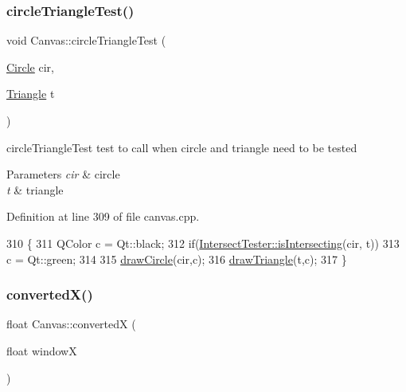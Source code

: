 \mbox{\label{class_canvas_a528559214b858f9f9cd0a57ca95fb630}} 
\subsubsection{\texorpdfstring{circle\+Triangle\+Test()}{circleTriangleTest()}}
{\footnotesize\ttfamily void Canvas\+::circle\+Triangle\+Test (\begin{DoxyParamCaption}\item[{\hyperlink{class_circle}{Circle}}]{cir,  }\item[{\hyperlink{class_triangle}{Triangle}}]{t }\end{DoxyParamCaption})\hspace{0.3cm}{\ttfamily [private]}}



circle\+Triangle\+Test test to call when circle and triangle need to be tested 


\begin{DoxyParams}{Parameters}
{\em cir} & circle \\
\hline
{\em t} & triangle \\
\hline
\end{DoxyParams}


Definition at line 309 of file canvas.\+cpp.


\begin{DoxyCode}
310 \{
311     QColor c = Qt::black;
312     \textcolor{keywordflow}{if}(\hyperlink{class_intersect_tester_a7710e17ff7d2e229059f23b9429213f5}{IntersectTester::isIntersecting}(cir, t))
313         c = Qt::green;
314 
315     \hyperlink{class_canvas_ab1413076d90539aea7ac3a06b065afe2}{drawCircle}(cir,c);
316     \hyperlink{class_canvas_a74dd9cf1e8f3b48e2df2b34886770ac6}{drawTriangle}(t,c);
317 \}
\end{DoxyCode}
\mbox{\label{class_canvas_afddf8ae4dcfb9557ae557b9f998f5d5a}} 
\subsubsection{\texorpdfstring{converted\+X()}{convertedX()}}
{\footnotesize\ttfamily float Canvas\+::convertedX (\begin{DoxyParamCaption}\item[{float}]{windowX }\end{DoxyParamCaption})\hspace{0.3cm}{\ttfamily [private]}}



